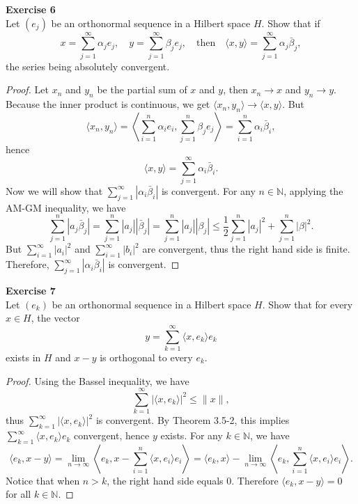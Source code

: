 \documentclass[12pt, a4paper]{article}
\theoremstyle{plain}
\newcommand{\N}{\mathbb{N}}
\newenvironment{exercise}[2][Exercise]
    { \begin{mdframed}[backgroundcolor=gray!20] \textbf{#1 #2} \\}
    {  \end{mdframed}}
\begin{document}
\begin{exercise}{6}
Let $(e_j)$ be an orthonormal sequence in a Hilbert space $H$. Show that if 
\[
x  =\sum_{j=1}^{\infty}{\alpha_je_j},\quad y = \sum_{j=1}^{\infty}{\beta_je_j}, \quad \text{then}\quad \langle{x,y}\rangle = \sum_{j=1}^{\infty}{\alpha_j\bar \beta_j},
\]
the series being absolutely convergent.
\end{exercise}
	\begin{proof}
	Let $x_n$ and $y_n$ be the partial sum of $x$ and $y$, then $x_n\rightarrow x$ and $y_n\rightarrow y$. Because the inner product is continuous, we get $\langle{x_n,y_n}\rangle\rightarrow \langle{x,y}\rangle$. But
	\[
	\langle{x_n,y_n}\rangle = \left\langle{\sum_{i=1}^{n}{\alpha_ie_i},\sum_{j=1}^{n}{\beta_je_j}}\right\rangle = \sum_{i=1}^{n}{\alpha_i\bar\beta_i},
	\]
	hence
	\[
	\langle{x,y}\rangle = \sum_{j=1}^{\infty}{\alpha_i\bar\beta_i}.
	\]
	Now we will show that $\sum_{j=1}^{\infty}{|\alpha_i\bar\beta_i|}$ is convergent. For any $n\in \N$, applying the AM-GM inequality, we have
	\[
	\sum_{j=1}^{n}{|a_j\bar\beta_j|}=\sum_{j=1}^{n}{|a_j||\bar\beta_j|} = \sum_{j=1}^{n}{|a_j||\beta_j|} \leq \frac{1}{2}\sum_{j=1}^{n}{|a_j|^2}+\sum_{j=1}^{n}{|\beta|^2}.
	\]
	But $\sum_{i=1}^{\infty}{|a_i|^2}$ and $\sum_{i=1}^{\infty}{|b_i|^2}$ are convergent, thus the right hand side is finite. Therefore, $\sum_{j=1}^{\infty}{|\alpha_i\bar\beta_i|}$ is convergent.
	\end{proof}

\begin{exercise}{7}
Let $(e_k)$ be an orthonormal sequence in a Hilbert space $H$. Show that for every $x\in H$, the vector
\[
y=\sum_{k=1}^{\infty}{\langle{x,e_k}\rangle e_k}
\]
exists in $H$ and $x-y$ is orthogonal to every $e_k$.
\end{exercise}
	\begin{proof}
	Using the Bassel inequality, we have 
	\[
	\sum_{k=1}^{\infty}{|\langle{x,e_k}\rangle|^2}\leq \|x\|,
	\]
	thus $\sum_{k=1}^{\infty}{|\langle{x,e_k}\rangle|^2}$ is convergent. By Theorem 3.5-2, this implies $\sum_{k=1}^{\infty}{\langle{x,e_k}\rangle e_k}$ convergent, hence $y$ exists. For any $k\in \N$, we have
	\[
	\langle{e_k,x-y}\rangle = \lim_{n\rightarrow\infty}\left\langle{e_k,x-\sum_{i=1}^{n}{\langle{x,e_i}\rangle e_i}}\right\rangle = \langle{e_k,x}\rangle - \lim_{n\rightarrow \infty}\left\langle{e_k,\sum_{i=1}^{n}{\langle{x,e_i}\rangle e_i}}\right\rangle.
	\]
	Notice that when $n>k$, the right hand side equals $0$. Therefore $\langle{e_k,x-y}\rangle = 0$ for all $k\in\N$.
	\end{proof}
\end{document}
